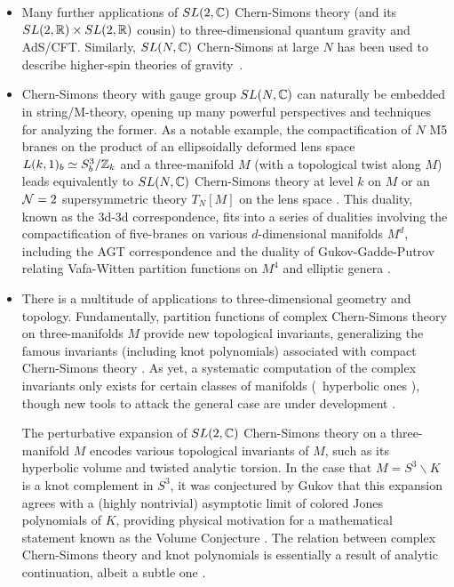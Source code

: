 \documentclass[12pt]{article}
\begin{document}
\begin{itemize}
\item Many further applications of $SL(2,{\mathbb C})$ Chern-Simons theory (and its $SL(2,{\mathbb R})\times SL(2,{\mathbb R})$ cousin) to three-dimensional quantum gravity and AdS/CFT.
Similarly, $SL(N,{\mathbb C})$ Chern-Simons at large $N$ has been used to describe higher-spin theories of gravity~\cite{DICFPT-spin3, DIGaberdielGopakumar}.


\item Chern-Simons theory with gauge group $SL(N,{\mathbb C})$ can naturally be embedded in string/M-theory, opening up many powerful perspectives and techniques for analyzing the former.
As a notable example, the compactification of $N$ M5 branes on the product of an ellipsoidally deformed lens space $L(k,1)_b\simeq S^3_b/{\mathbb Z}_k$ and a three-manifold $M$ (with a topological twist along $M$) leads equivalently to $SL(N,{\mathbb C})$ Chern-Simons theory at level $k$ on $M$ \cite{DICJ-S3, DILY-S2, DIYagi-S2} or an $\mathcal{N}=2$ supersymmetric theory $T_N[M]$ on the lens space \cite{DIDGH, DIDG-Sdual, DIYamazaki-3d, DIDGG}. This duality, known as the 3d-3d correspondence, fits into a series of dualities involving the compactification of five-branes on various $d$-dimensional manifolds $M^d$, including the AGT correspondence \cite{DIAGT} and the duality of Gukov-Gadde-Putrov relating Vafa-Witten partition functions on $M^4$ and elliptic genera \cite{DIGGP-4d}. 




\item There is a multitude of applications to three-dimensional geometry and topology. Fundamentally, partition functions of complex Chern-Simons theory on three-manifolds $M$ provide new topological invariants, generalizing the famous invariants (including knot polynomials) associated with compact Chern-Simons theory \cite{DIWit-Jones, DIResh-Tur}. As yet, a systematic computation of the complex invariants only exists for certain classes of manifolds (\DIeg\ hyperbolic ones \cite{DIKashAnd, DIDGG-index, DIAK-complexCS, DID-levelk}), though new tools to attack the general case are under development \cite{DIGukovPei, DIPeiKe}.

The perturbative expansion of $SL(2,{\mathbb C})$ Chern-Simons theory on a three-manifold $M$ encodes various topological invariants of $M$, such as its hyperbolic volume and twisted analytic torsion. In the case that $M=S^3\backslash K$ is a knot complement in $S^3$, it was conjectured by Gukov \cite{DIgukov-2003} that this expansion agrees with a (highly nontrivial) asymptotic limit of colored Jones polynomials of $K$, providing physical motivation for a mathematical statement known as the Volume Conjecture \cite{DIkashaev-1997, DIMur-Mur}. The relation between complex Chern-Simons theory and knot polynomials is essentially a result of analytic continuation, albeit a subtle one \cite{DIWit-anal}.


\end{itemize}
\end{document}
